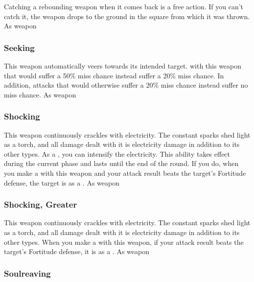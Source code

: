 Catching a rebounding weapon when it comes back is a free action.
If you can't catch it, the weapon drops to the ground in the square from which it was thrown.
 
 As weapon
\lowercase{\hypertarget{item:Seeking}{}}\label{item:Seeking}
\hypertarget{item:Seeking}{\subsubsection{Seeking\hfill{}}}
This weapon automatically veers towards its intended target.
 with this weapon that would suffer a 50\% miss chance instead suffer a 20\% miss chance.
In addition, attacks that would otherwise suffer a 20\% miss chance instead suffer no miss chance.
 
 As weapon
\lowercase{\hypertarget{item:Shocking}{}}\label{item:Shocking}
\hypertarget{item:Shocking}{\subsubsection{Shocking\hfill{}}}
This weapon continuously crackles with electricity.
The constant sparks shed light as a torch, and all damage dealt with it is electricity damage in addition to its other types.
As a , you can intensify the electricity.
This ability takes effect during the current phase and lasts until the end of the round.
If you do, when you make a  with this weapon and your attack result beats the target's Fortitude defense, the target is \dazed as a .
 
 As weapon
\lowercase{\hypertarget{item:Shocking, Greater}{}}\label{item:Shocking, Greater}
\hypertarget{item:Shocking, Greater}{\subsubsection{Shocking, Greater\hfill{}}}
This weapon continuously crackles with electricity.
The constant sparks shed light as a torch, and all damage dealt with it is electricity damage in addition to its other types.
When you make a  with this weapon, if your attack result beats the target's Fortitude defense, it is \dazed as a .
 
 As weapon
\lowercase{\hypertarget{item:Soulreaving}{}}\label{item:Soulreaving}
\hypertarget{item:Soulreaving}{\subsubsection{Soulreaving\hfill{}}}
